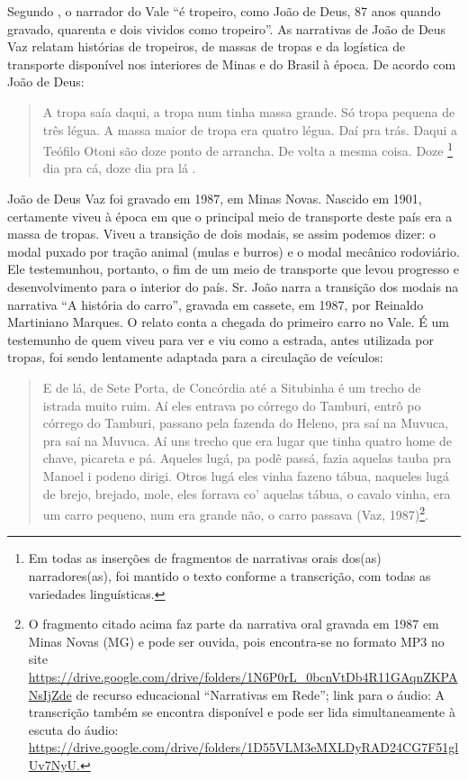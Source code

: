 \documentclass[portuguese]{textolivre}
\begin{document}
Segundo \textcite[p.~20]{Pereira1996}, o narrador do Vale “é tropeiro, como João de Deus, 87 anos quando gravado, quarenta e dois vividos como tropeiro”. As narrativas de João de Deus Vaz relatam histórias de tropeiros, de massas de tropas e da logística de transporte disponível nos interiores de Minas e do Brasil à época. De acordo com João de Deus:

\begin{quote}
    A tropa saía daqui, a tropa num tinha massa grande. Só tropa pequena de três légua. A massa maior de tropa era quatro légua. Daí pra trás. Daqui a Teófilo Otoni são doze ponto de arrancha. De volta a mesma coisa. Doze \footnote{Em todas as inserções de fragmentos de narrativas orais dos(as) narradores(as), foi mantido o texto conforme a transcrição, com todas as variedades linguísticas.} dia pra cá, doze dia pra lá \cite[p. 21]{Pereira1996}.
\end{quote}

João de Deus Vaz foi gravado em 1987, em Minas Novas. Nascido em 1901, certamente viveu à época em que o principal meio de transporte deste país era a massa de tropas. Viveu a transição de dois modais, se assim podemos dizer: o modal puxado por tração animal (mulas e burros) e o modal mecânico rodoviário. Ele testemunhou, portanto, o fim de um meio de transporte que levou progresso e desenvolvimento para o interior do país. Sr. João narra a transição dos modais na narrativa “A história do carro”, gravada em cassete, em 1987, por Reinaldo Martiniano Marques. O relato conta a chegada do primeiro carro no Vale. É um testemunho de quem viveu para ver e viu como a estrada, antes utilizada por tropas, foi sendo lentamente adaptada para a circulação de veículos:

\begin{quote}
    E de lá, de Sete Porta, de Concórdia até a Situbinha é um trecho de istrada muito ruim. Aí eles entrava po córrego do Tamburi, entrô po córrego do Tamburi, passano pela fazenda do Heleno, pra saí na Muvuca, pra saí na Muvuca. Aí uns trecho que era lugar que tinha quatro home de chave, picareta e pá. Aqueles lugá, pa podê passá, fazia aquelas tauba pra Manoel i podeno dirigi. Otros lugá eles vinha fazeno tábua, naqueles lugá de brejo, brejado, mole, eles forrava co’ aquelas tábua, o cavalo vinha, era um carro pequeno, num era grande não, o carro passava (Vaz, 1987)\footnote{O fragmento citado acima faz parte da narrativa oral gravada em 1987 em Minas Novas (MG)  e pode ser ouvida, pois encontra-se no formato MP3 no site \url{https://drive.google.com/drive/folders/1N6P0rL_0bcnVtDb4R11GAqnZKPANsIjZde} de recurso educacional “Narrativas em Rede”; link para o áudio: A transcrição também se encontra disponível e pode ser lida simultaneamente à escuta do áudio: \url{https://drive.google.com/drive/folders/1D55VLM3eMXLDyRAD24CG7F51glUv7NyU.}}.
\end{quote}
\end{document}

